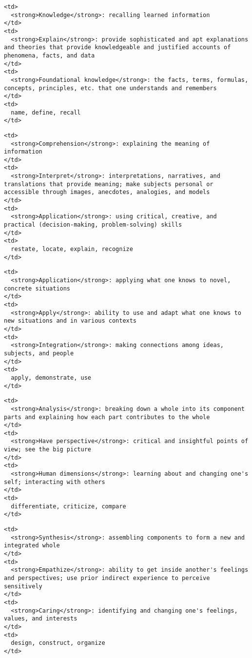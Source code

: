 \begin{verbatim}
<td>
  <strong>Knowledge</strong>: recalling learned information
</td>
<td>
  <strong>Explain</strong>: provide sophisticated and apt explanations and theories that provide knowledgeable and justified accounts of phenomena, facts, and data
</td>
<td>
  <strong>Foundational knowledge</strong>: the facts, terms, formulas, concepts, principles, etc. that one understands and remembers
</td>
<td>
  name, define, recall
</td>
\end{verbatim}

\begin{verbatim}
<td>
  <strong>Comprehension</strong>: explaining the meaning of information
</td>
<td>
  <strong>Interpret</strong>: interpretations, narratives, and translations that provide meaning; make subjects personal or accessible through images, anecdotes, analogies, and models
</td>
<td>
  <strong>Application</strong>: using critical, creative, and practical (decision-making, problem-solving) skills
</td>
<td>
  restate, locate, explain, recognize
</td>
\end{verbatim}

\begin{verbatim}
<td>
  <strong>Application</strong>: applying what one knows to novel, concrete situations
</td>
<td>
  <strong>Apply</strong>: ability to use and adapt what one knows to new situations and in various contexts
</td>
<td>
  <strong>Integration</strong>: making connections among ideas, subjects, and people
</td>
<td>
  apply, demonstrate, use
</td>
\end{verbatim}

\begin{verbatim}
<td>
  <strong>Analysis</strong>: breaking down a whole into its component parts and explaining how each part contributes to the whole
</td>
<td>
  <strong>Have perspective</strong>: critical and insightful points of view; see the big picture
</td>
<td>
  <strong>Human dimensions</strong>: learning about and changing one's self; interacting with others
</td>
<td>
  differentiate, criticize, compare
</td>
\end{verbatim}

\begin{verbatim}
<td>
  <strong>Synthesis</strong>: assembling components to form a new and integrated whole
</td>
<td>
  <strong>Empathize</strong>: ability to get inside another's feelings and perspectives; use prior indirect experience to perceive sensitively
</td>
<td>
  <strong>Caring</strong>: identifying and changing one's feelings, values, and interests
</td>
<td>
  design, construct, organize
</td>
\end{verbatim}


